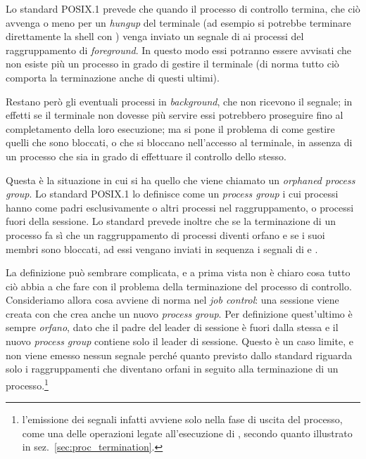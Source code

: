 Lo standard POSIX.1 prevede che quando il processo di controllo termina, che
ciò avvenga o meno per un \textit{hungup} del terminale (ad esempio si
potrebbe terminare direttamente la shell con ) venga inviato un
segnale di  ai processi del raggruppamento di
\textit{foreground}. In questo modo essi potranno essere avvisati che non
esiste più un processo in grado di gestire il terminale (di norma tutto ciò
comporta la terminazione anche di questi ultimi).

Restano però gli eventuali processi in \textit{background}, che non ricevono
il segnale; in effetti se il terminale non dovesse più servire essi potrebbero
proseguire fino al completamento della loro esecuzione; ma si pone il problema
di come gestire quelli che sono bloccati, o che si bloccano nell'accesso al
terminale, in assenza di un processo che sia in grado di effettuare il
controllo dello stesso.

Questa è la situazione in cui si ha quello che viene chiamato un
 \textit{orphaned process group}. Lo standard
POSIX.1 lo definisce come un \textit{process group} i cui processi hanno come
padri esclusivamente o altri processi nel raggruppamento, o processi fuori
della sessione.  Lo standard prevede inoltre che se la terminazione di un
processo fa sì che un raggruppamento di processi diventi orfano e se i suoi
membri sono bloccati, ad essi vengano inviati in sequenza i segnali di
 e .

La definizione può sembrare complicata, e a prima vista non è chiaro cosa
tutto ciò abbia a che fare con il problema della terminazione del processo di
controllo.  Consideriamo allora cosa avviene di norma nel \textit{job
  control}: una sessione viene creata con  che crea anche un
nuovo \textit{process group}. Per definizione quest'ultimo è sempre
\textsl{orfano}, dato che il padre del leader di sessione è fuori dalla stessa
e il nuovo \textit{process group} contiene solo il leader di sessione. Questo
è un caso limite, e non viene emesso nessun segnale perché quanto previsto
dallo standard riguarda solo i raggruppamenti che diventano orfani in seguito
alla terminazione di un processo.\footnote{l'emissione dei segnali infatti
  avviene solo nella fase di uscita del processo, come una delle operazioni
  legate all'esecuzione di , secondo quanto illustrato in
  sez.~\ref{sec:proc_termination}.}

